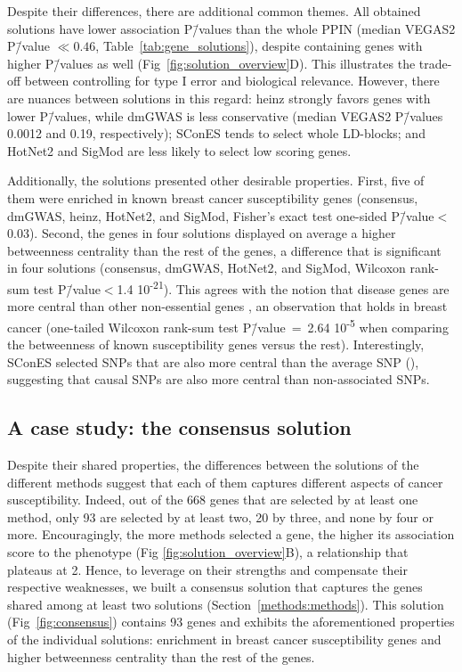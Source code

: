\documentclass[10pt,letterpaper]{article}
\begin{document}
Despite their differences, there are additional common themes. All obtained solutions have lower association P\=/values than the whole PPIN (median VEGAS2 P\=/value $\ll 0.46$, Table~\ref{tab:gene_solutions}), despite containing genes with higher P\=/values as well (Fig~\ref{fig:solution_overview}D). This illustrates the trade-off between controlling for type I error and biological relevance. However, there are nuances between solutions in this regard: heinz strongly favors genes with lower P\=/values, while dmGWAS is less conservative (median VEGAS2 P\=/values 0.0012 and 0.19, respectively); SConES tends to select whole LD-blocks; and HotNet2 and SigMod are less likely to select low scoring genes.

Additionally, the solutions presented other desirable properties. First, five of them were enriched in known breast cancer susceptibility genes (consensus, dmGWAS, heinz, HotNet2, and SigMod, Fisher's exact test one-sided P\=/value$<$0.03). Second, the genes in four solutions displayed on average a higher betweenness centrality than the rest of the genes, a difference that is significant in four solutions (consensus, dmGWAS, HotNet2, and SigMod, Wilcoxon rank-sum test P\=/value$<$1.4 \texttimes{} 10\textsuperscript{-21}). This agrees with the notion that disease genes are more central than other non-essential genes \cite{pinero_uncovering_2016}, an observation that holds in breast cancer (one-tailed Wilcoxon rank-sum test P\=/value~=~2.64 \texttimes{} 10\textsuperscript{-5} when comparing the betweenness of known susceptibility genes versus the rest). Interestingly, SConES selected SNPs that are also more central than the average SNP (), suggesting that causal SNPs are also more central than non-associated SNPs.

\subsection{A case study: the consensus solution}
\label{results:consensus}

Despite their shared properties, the differences between the solutions of the different methods suggest that each of them captures different aspects of cancer susceptibility. Indeed, out of the 668 genes that are selected by at least one method, only 93 are selected by at least two, 20 by three, and none by four or more. Encouragingly, the more methods selected a gene, the higher its association score to the phenotype (Fig \ref{fig:solution_overview}B), a relationship that plateaus at 2. Hence, to leverage on their strengths and compensate their respective weaknesses, we built a consensus solution that captures the genes shared among at least two solutions (Section~\ref{methods:methods}). This solution (Fig~\ref{fig:consensus}) contains 93 genes and exhibits the aforementioned properties of the individual solutions: enrichment in breast cancer susceptibility genes and higher betweenness centrality than the rest of the genes. 
\end{document}
